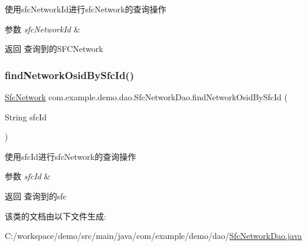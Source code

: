 使用sfc\+Network\+Id进行sfc\+Network的查询操作 
\begin{DoxyParams}{参数}
{\em sfc\+Network\+Id} & \\
\hline
\end{DoxyParams}
\begin{DoxyReturn}{返回}
查询到的\+S\+F\+C\+Network 
\end{DoxyReturn}
\mbox{\label{interfacecom_1_1example_1_1demo_1_1dao_1_1_sfc_network_dao_a9f66e6bad7f7a606f0ca8da2a907e0db}} 
\subsubsection{\texorpdfstring{find\+Network\+Osid\+By\+Sfc\+Id()}{findNetworkOsidBySfcId()}}
{\footnotesize\ttfamily \mbox{\hyperlink{classcom_1_1example_1_1demo_1_1modular_1_1_sfc_network}{Sfc\+Network}} com.\+example.\+demo.\+dao.\+Sfc\+Network\+Dao.\+find\+Network\+Osid\+By\+Sfc\+Id (\begin{DoxyParamCaption}\item[{String}]{sfc\+Id }\end{DoxyParamCaption})}

使用sfc\+Id进行sfc\+Network的查询操作 
\begin{DoxyParams}{参数}
{\em sfc\+Id} & \\
\hline
\end{DoxyParams}
\begin{DoxyReturn}{返回}
查询到的sfc 
\end{DoxyReturn}


该类的文档由以下文件生成\+:\begin{DoxyCompactItemize}
\item 
C\+:/workspace/demo/src/main/java/com/example/demo/dao/\mbox{\hyperlink{_sfc_network_dao_8java}{Sfc\+Network\+Dao.\+java}}\end{DoxyCompactItemize}

